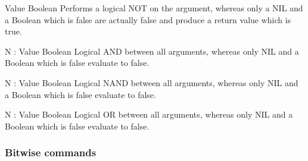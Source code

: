     \begin{commands}

                {Value}
                {Boolean}
                {
                    Performs a logical NOT on the argument, whereas only a NIL
                    and a Boolean which is false are actually false and produce
                    a return value which is true.
                }

                {N : Value}
                {Boolean}
                {
                    Logical AND between all arguments, whereas only NIL and a
                    Boolean which is false evaluate to false.
                }

                {N : Value}
                {Boolean}
                {
                    Logical NAND between all arguments, whereas only NIL and a
                    Boolean which is false evaluate to false.
                }

                {N : Value}
                {Boolean}
                {
                    Logical OR between all arguments, whereas only NIL and a
                    Boolean which is false evaluate to false.
                }

    \end{commands}

\subsubsection{Bitwise commands}




